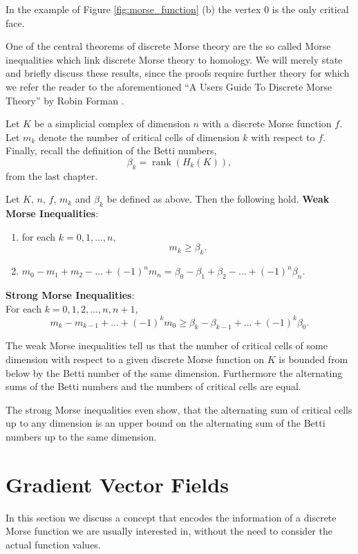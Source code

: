 In the example of Figure \ref{fig:morse_function} (b) the vertex $0$ is the only critical face.

One of the central theorems of discrete Morse theory are the so called Morse inequalities which link discrete Morse theory to homology. We will merely state and briefly discuss these results, since the proofs require further theory for which we refer the reader to the aforementioned 
\enquote{A Users Guide To Discrete Morse Theory} by Robin Forman  \cite{Morse+Users+Guide}. 

Let $K$ be a simplicial complex of dimension $n$ with a discrete Morse function $f$. Let $m_k$ denote the number of critical cells of dimension $k$ with respect to $f$. Finally, recall the definition of the Betti numbers, \[
\beta_k = \operatorname{rank}(H_k(K)),
\] from the last chapter. 

\begin{thm} Let $K$, $n$, $f$, $m_k$ and $\beta_k$ be defined as above. Then the following hold. 
\textbf{Weak Morse Inequalities}: 
\begin{enumerate}
    \item for each $k = 0,1,\dots,n$, \[
        m_k \geq \beta_k.
    \]
    \item $m_0 - m_1 + m_2 - \dots + (-1)^n m_n = \beta_0 - \beta_1 + \beta_2 - \dots + (-1)^n \beta_n.$
\end{enumerate}
\textbf{Strong Morse Inequalities}: \\
For each $k = 0,1,2,\dots,n,n+1$, 
\[
    m_k - m_{k-1} + \dots + (-1)^k m_0 \geq \beta_k - \beta_{k-1} + \dots + (-1)^k \beta_0.
\]
\label{thm:morse_ineq}
\end{thm}

The weak Morse inequalities tell us that the number of critical cells of some dimension with respect to a given discrete Morse function on $K$ is bounded from below by the Betti number of the same dimension. Furthermore the alternating sums of the Betti numbers and the numbers of critical cells are equal. 

The strong Morse inequalities even show, that the alternating sum of critical cells up to any dimension is an upper bound on the alternating sum of the Betti numbers up to the same dimension.

\section{Gradient Vector Fields}
In this section we discuss a concept that encodes the information of a discrete Morse function we are usually interested in, without the need to consider the actual function values. 

